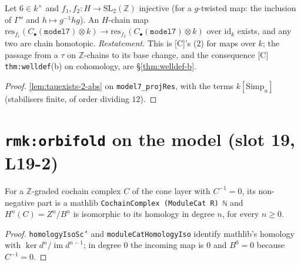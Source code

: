 \begin{theorem}\label{lem:tauexists-2-model}
  \leanok
  Let $6\in k^\times$ and $f_1,f_2:H\to\mathrm{SL}_2(\mathbb Z)$ injective (for a $g$-twisted map: the inclusion of
  $\Gamma''$ and $h\mapsto g^{-1}hg$). An $H$-chain map $\mathrm{res}_{f_1}(C_\bullet(\mathtt{model7})\otimes k)\to
  \mathrm{res}_{f_2}(C_\bullet(\mathtt{model7})\otimes k)$ over $\mathrm{id}_k$ exists, and any two are chain homotopic.
  \emph{Restatement.} This is [C]'s (2) for maps over $k$; the passage from a $\tau$ on $\mathbb Z$-chains to its
  base change, and the consequence [C] \texttt{thm:welldef}(b) on cohomology, are \S\ref{thm:welldef-b}.
\end{theorem}
\begin{proof}
  \leanok
  \ref{lem:tauexists-2-abs} on \texttt{model7\_projRes}, with the terms $k[\mathrm{Simp}_n]$ (stabilisers finite, of order
  dividing $12$).
\end{proof}

\section{\texttt{rmk:orbifold} on the model (slot 19, L19-2)}

\begin{lemma}\label{lem:cochaincx-homology}
  \leanok
  For a $\mathbb Z$-graded cochain complex $C$ of the cone layer with $C^{-1}=0$, its non-negative part is a mathlib
  \texttt{CochainComplex (ModuleCat R) ℕ} and $H^n(C)=Z^n/B^n$ is isomorphic to its homology in degree $n$, for every
  $n\ge0$.
\end{lemma}
\begin{proof}
  \leanok
  \texttt{homologyIsoSc'} and \texttt{moduleCatHomologyIso} identify mathlib's homology with
  $\ker d^n/\operatorname{im}d^{n-1}$; in degree $0$ the incoming map is $0$ and $B^0=0$ because $C^{-1}=0$.
\end{proof}

